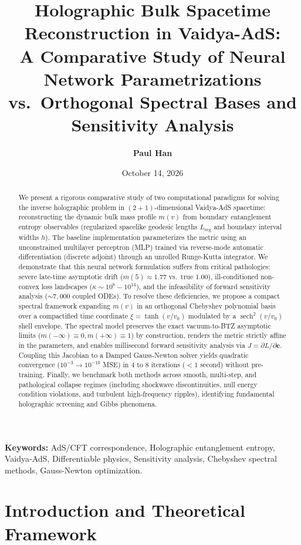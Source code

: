\documentclass[11pt,a4paper]{article}
\title{\textbf{\Large Holographic Bulk Spacetime Reconstruction in Vaidya-AdS:\\[0.3em]
\large A Comparative Study of Neural Network Parametrizations vs.\ Orthogonal Spectral Bases and Sensitivity Analysis}}
\author{\textbf{Paul Han}}
\date{\small October 14, 2026}
\begin{document}
\maketitle

\begin{abstract}
We present a rigorous comparative study of two computational paradigms for solving the inverse holographic problem in $(2+1)$-dimensional Vaidya-AdS spacetime: reconstructing the dynamic bulk mass profile $m(v)$ from boundary entanglement entropy observables (regularized spacelike geodesic lengths $L_{\mathrm{reg}}$ and boundary interval widths $h$). The baseline implementation parameterizes the metric using an unconstrained multilayer perceptron (MLP) trained via reverse-mode automatic differentiation (discrete adjoint) through an unrolled Runge-Kutta integrator. We demonstrate that this neural network formulation suffers from critical pathologies: severe late-time asymptotic drift ($m(5) \approx 1.77$ vs.\ true $1.00$), ill-conditioned non-convex loss landscapes ($\kappa \sim 10^8 - 10^{14}$), and the infeasibility of forward sensitivity analysis ($\sim 7{,}000$ coupled ODEs). To resolve these deficiencies, we propose a compact spectral framework expanding $m(v)$ in an orthogonal Chebyshev polynomial basis over a compactified time coordinate $\xi = \tanh(v/v_0)$ modulated by a $\operatorname{sech}^2(v/v_0)$ shell envelope. The spectral model preserves the exact vacuum-to-BTZ asymptotic limits ($m(-\infty) \equiv 0, m(+\infty) \equiv 1$) by construction, renders the metric strictly affine in the parameters, and enables millisecond forward sensitivity analysis via $J = \partial L / \partial \mathbf{c}$. Coupling this Jacobian to a Damped Gauss-Newton solver yields quadratic convergence ($10^{-3} \to 10^{-10}$ MSE) in $4$ to $8$ iterations ($< 1$ second) without pre-training. Finally, we benchmark both methods across smooth, multi-step, and pathological collapse regimes (including shockwave discontinuities, null energy condition violations, and turbulent high-frequency ripples), identifying fundamental holographic screening and Gibbs phenomena.
\end{abstract}

\vspace{0.5em}
\noindent\textbf{Keywords:} AdS/CFT correspondence, Holographic entanglement entropy, Vaidya-AdS, Differentiable physics, Sensitivity analysis, Chebyshev spectral methods, Gauss-Newton optimization.

\hrulefill

\section{Introduction and Theoretical Framework}
\end{document}
